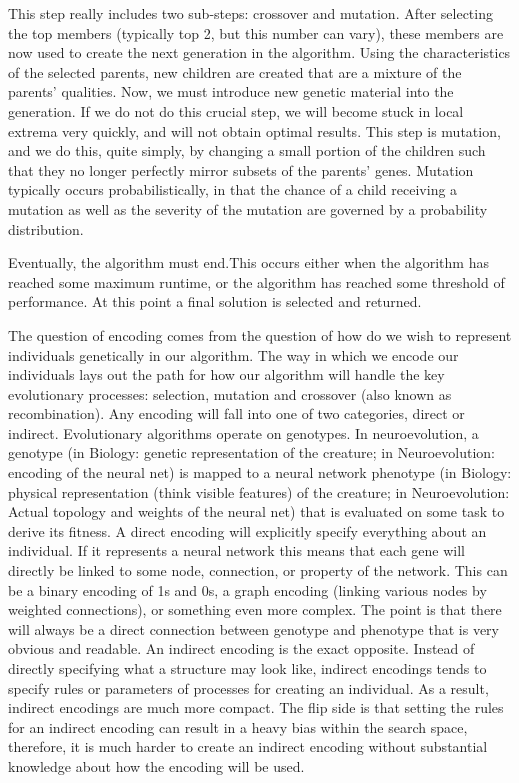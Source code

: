 \documentclass[journal, a4paper]{IEEEtran}
\begin{document}
This step really includes two sub-steps: crossover and mutation. After selecting the top members (typically top 2, but this number can vary), these members are now used to create the next generation in the algorithm. Using the characteristics of the selected parents, new children are created that are a mixture of the parents’ qualities. 
Now, we must introduce new genetic material into the generation. If we do not do this crucial step, we will become stuck in local extrema very quickly, and will not obtain optimal results. This step is mutation, and we do this, quite simply, by changing a small portion of the children such that they no longer perfectly mirror subsets of the parents’ genes. Mutation typically occurs probabilistically, in that the chance of a child receiving a mutation as well as the severity of the mutation are governed by a probability distribution. \cite{cite04}

Eventually, the algorithm must end.This occurs either when the algorithm has reached some maximum runtime, or the algorithm has reached some threshold of performance. At this point a final solution is selected and returned. \cite{cite04}

The question of encoding comes from the question of how do we wish to represent individuals genetically in our algorithm. The way in which we encode our individuals lays out the path for how our algorithm will handle the key evolutionary processes: selection, mutation and crossover (also known as recombination). Any encoding will fall into one of two categories, direct or indirect. \cite{cite02}
Evolutionary algorithms operate on genotypes. In neuroevolution, a genotype (in Biology: genetic representation of the creature; in Neuroevolution: encoding of the neural net) is mapped to a neural network phenotype (in Biology: physical representation (think visible features) of the creature; in Neuroevolution: Actual topology and weights of the neural net) that is evaluated on some task to derive its fitness.
A direct encoding will explicitly specify everything about an individual. If it represents a neural network this means that each gene will directly be linked to some node, connection, or property of the network. This can be a binary encoding of 1s and 0s, a graph encoding (linking various nodes by weighted connections), or something even more complex. The point is that there will always be a direct connection between genotype and phenotype that is very obvious and readable. \cite{cite02}
An indirect encoding is the exact opposite. Instead of directly specifying what a structure may look like, indirect encodings tends to specify rules or parameters of processes for creating an individual. As a result, indirect encodings are much more compact. The flip side is that setting the rules for an indirect encoding can result in a heavy bias within the search space, therefore, it is much harder to create an indirect encoding without substantial knowledge about how the encoding will be used. \cite{cite02}
\end{document}
